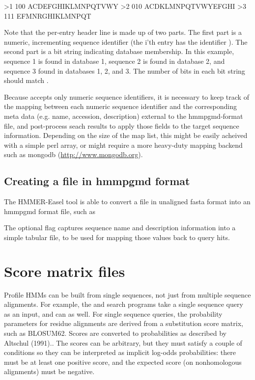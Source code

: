 \begin{sreoutput}
>1 100
ACDEFGHIKLMNPQTVWY
>2 010
ACDKLMNPQTVWYEFGHI
>3 111
EFMNRGHIKLMNPQT
\end{sreoutput}

Note that the per-entry header line is made up of two parts. The first part 
is a numeric, incrementing sequence identifier (the i'th entry has the
identifier ). The second part is a bit string indicating database
membership. In this example, sequence 1 is found in database 1, sequence 2 is
found in database 2, and sequence 3 found in databases 1, 2, and 3. The number 
of bits in each bit string should match .

Because  accepts only numeric sequence identifiers, it is
necessary to keep track of the mapping between each numeric sequence identifier
and the corresponding meta data (e.g. name, accession, description) external to
the hmmpgmd-format file, and post-process  seach results to 
apply those fields to the target sequence information.
Depending on the size of the map list, this might be easily acheived with a
simple perl array, or might require a more heavy-duty mapping backend such as
mongodb (\url{http://www.mongodb.org}).
  

\subsection{Creating a file in hmmpgmd format}

The HMMER-Easel tool  is able to convert a file in unaligned
fasta format into an hmmpgmd format file, such as


The optional  flag captures sequence name and description
information into a simple tabular file, to be used for mapping those values 
back to  query hits.




\section{Score matrix files}

Profile HMMs can be built from single sequences, not just from
multiple sequence alignments. For example, the  and
 search programs take a single sequence query as an
input, and  can as well. For single sequence queries, the
probability parameters for residue alignments are derived from a
substitution score matrix, such as BLOSUM62. Scores are converted to
probabilities as described by Altschul (1991).\cite{Altschul91}. The
scores can be arbitrary, but they must satisfy a couple of conditions
so they can be interpreted as implicit log-odds probabilities: there
must be at least one positive score, and the expected score (on
nonhomologous alignments) must be negative.

